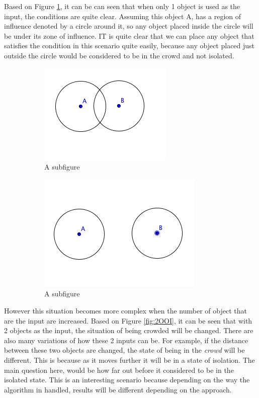 \documentclass[a4paper,11pt]{article}
\begin{document}
Based on Figure \ref{fig:1OOI}, it can be can seen that when only 1 object is used as the input, the conditions are quite clear. Assuming this object A, has a region of influence denoted by a circle around it, so any object placed inside the circle will be under its zone of influence. IT is quite clear that we can place any object that satisfies the condition in this scenario quite easily, because any object placed just outside the circle would be considered to be in the crowd and not isolated. 

\begin{figure}[h]
\centering
\begin{subfigure}{.4\textwidth}
  \centering
  \includegraphics[width=.4\linewidth]{2OOIClose}
  \caption{A subfigure}
  \label{fig:1OOI}
\end{subfigure}%
\begin{subfigure}{.4\textwidth}
  \centering
  \includegraphics[width=.4\linewidth]{2OOIFar}
  \caption{A subfigure}
  \label{fig:2OOIFar}
\end{subfigure}
\caption{}
\label{fig:Condition}
\end{figure}


However this situation becomes more complex when the number of object that are the input are increased. Based on Figure \ref{fig:2OOI}, it can be seen that with 2 objects as the input, the situation of being crowded will be changed. There are also many variations of how these 2 inputs can be. For example, if the distance between these two objects are changed, the state of being in the \textit{crowd} will be different. This is because as it moves further it will be in a state of isolation. The main question here, would be how far out before it considered to be in the isolated state. This is an interesting scenario because depending on the way the algorithm in handled, results will be different depending on the approach.
\end{document}
